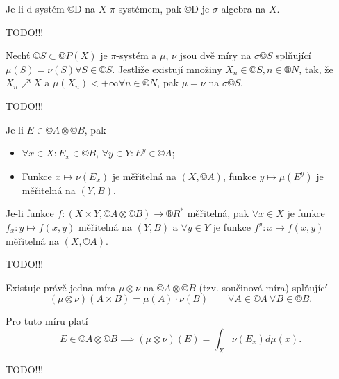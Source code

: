 \documentclass[12pt]{article}					%
\begin{document}
\begin{tvrzeni}
	Je-li d-systém ©D na $X$ $\pi$-systémem, pak ©D je $\sigma$-algebra na $X$.

	\begin{dukazin}
		TODO!!!
	\end{dukazin}
\end{tvrzeni}


\begin{veta}
	Nechť $©S \subset ©P(X)$ je $\pi$-systém a $\mu$, $\nu$ jsou dvě míry na $\sigma ©S$ splňující $\mu(S) = \nu(S) \forall S \in ©S$. Jestliže existují množiny $X_n \in ©S, n \in ®N$, tak, že $X_n \nearrow X$ a $\mu(X_n) < +∞ \forall n \in ®N$, pak $\mu = \nu$ na $\sigma ©S$.

	\begin{dukazin}
		TODO!!!
	\end{dukazin}
\end{veta}

\begin{veta}
	Je-li $E \in ©A \otimes ©B$, pak

	\begin{itemize}
		\item $\forall x \in X: E_x \in ©B$, $\forall y \in Y: E^y \in ©A$;
		\item Funkce $x \mapsto \nu(E_x)$ je měřitelná na $(X, ©A)$, funkce $y \mapsto \mu(E^y)$ je měřitelná na $(Y, B)$.
	\end{itemize}

	Je-li funkce $f: (X \times Y, ©A \otimes ©B) \rightarrow ®R^*$ měřitelná, pak $\forall x \in X$ je funkce $f_x: y \mapsto f(x, y)$ měřitelná na $(Y, B)$ a $\forall y \in Y$ je funkce $f^y: x \mapsto f(x, y)$ měřitelná na $(X, ©A)$.

	\begin{dukazin}
		TODO!!!
	\end{dukazin}
\end{veta}

\begin{veta}
	Existuje právě jedna míra $\mu \otimes \nu$ na $©A \otimes ©B$ (tzv. součinová míra) splňující
	$$ (\mu \otimes \nu)(A \times B) = \mu(A)·\nu(B) \qquad \forall A \in ©A\ \forall B \in ©B. $$

	Pro tuto míru platí
	$$ E \in ©A \otimes ©B \implies (\mu \otimes \nu)(E) = \int_X \nu(E_x) d\mu(x). $$

	\begin{dukazin}
		TODO!!!
	\end{dukazin}
\end{veta}
\end{document}

